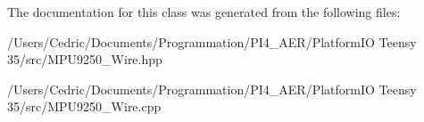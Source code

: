 The documentation for this class was generated from the following files\+:\begin{DoxyCompactItemize}
\item 
/\+Users/\+Cedric/\+Documents/\+Programmation/\+P\+I4\+\_\+\+A\+E\+R/\+Platform\+I\+O Teensy 35/src/M\+P\+U9250\+\_\+\+Wire.\+hpp\item 
/\+Users/\+Cedric/\+Documents/\+Programmation/\+P\+I4\+\_\+\+A\+E\+R/\+Platform\+I\+O Teensy 35/src/M\+P\+U9250\+\_\+\+Wire.\+cpp\end{DoxyCompactItemize}
